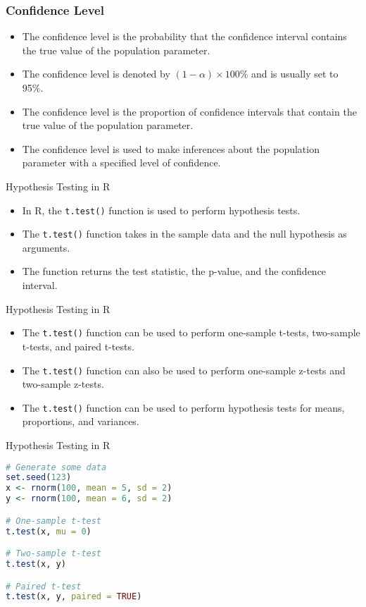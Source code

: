 \documentclass[serif, 9pt, aspectratio=32]{beamer}
\begin{document}
\begin{frame}
    \frametitle{Confidence Level}
    \begin{itemize}
        \setlength{\itemsep}{2em}
        \item The confidence level is the probability that the confidence interval contains the true value of the population parameter.
        \item The confidence level is denoted by $(1 - \alpha) \times 100\%$ and is usually set to 95\%.
        \item The confidence level is the proportion of confidence intervals that contain the true value of the population parameter.
        \item The confidence level is used to make inferences about the population parameter with a specified level of confidence.
    \end{itemize}
\end{frame}

\begin{frame}{Hypothesis Testing in R}
    \begin{itemize}
        \setlength{\itemsep}{2em}
        \item In R, the \texttt{t.test()} function is used to perform hypothesis tests.
        \item The \texttt{t.test()} function takes in the sample data and the null hypothesis as arguments.
        \item The function returns the test statistic, the p-value, and the confidence interval.
    \end{itemize}
\end{frame}

\begin{frame}{Hypothesis Testing in R}
    \begin{itemize}
        \setlength{\itemsep}{2em}
        \item The \texttt{t.test()} function can be used to perform one-sample t-tests, two-sample t-tests, and paired t-tests.
        \item The \texttt{t.test()} function can also be used to perform one-sample z-tests and two-sample z-tests.
        \item The \texttt{t.test()} function can be used to perform hypothesis tests for means, proportions, and variances.
    \end{itemize}
\end{frame}

\begin{frame}[fragile]{Hypothesis Testing in R}
    \begin{lstlisting}[language=R]
# Generate some data
set.seed(123)
x <- rnorm(100, mean = 5, sd = 2)
y <- rnorm(100, mean = 6, sd = 2)

# One-sample t-test
t.test(x, mu = 0)

# Two-sample t-test
t.test(x, y)

# Paired t-test
t.test(x, y, paired = TRUE)
    \end{lstlisting}
\end{frame}
\end{document}
